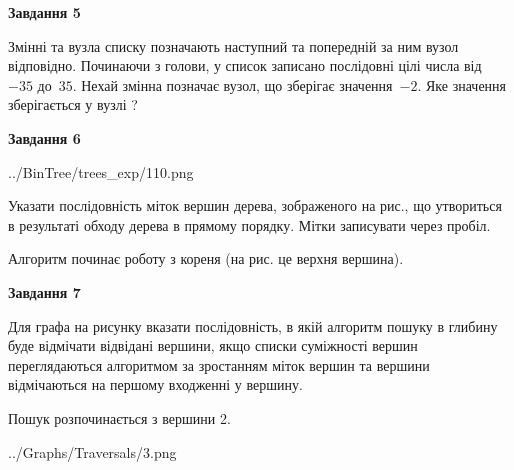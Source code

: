 \documentclass[12pt, ukrainian]{article}
\begin{document}
{\begin {large}
{\begin {center}\textbf{Завдання 5}\end {center}}\par
Змінні  та  вузла списку позначають наступний та попередній за ним вузол відповідно. Починаючи з голови, у список записано послідовні цілі числа від~$-35$ до~$35$. Нехай змінна  позначає вузол, що зберігає значення~$-2$.
Яке значення зберігається у вузлі  ?\par
\newpage

{\begin {center}\textbf{Завдання 6}\end {center}}\par

\begin{center}
	{../BinTree/trees_exp/110.png}
\end{center}
Указати послідовність міток вершин дерева, зображеного на рис., що утвориться в результаті обходу дерева в прямому порядку. Мітки записувати через пробіл.\par Алгоритм починає роботу з кореня (на рис. це верхня вершина).\par
\newpage

{\begin {center}\textbf{Завдання 7}\end {center}}\par
Для графа на рисунку вказати послідовність, в якій алгоритм пошуку в глибину буде відмічати відвідані вершини, якщо списки суміжності вершин переглядаються алгоритмом за зростанням міток вершин та вершини відмічаються на першому вход\-женні у вершину.\par
Пошук розпочинається з вершини 2.\par

\begin{center}
	{../Graphs/Traversals/3.png}
\end{center}\par
\newpage


\end{large}}
\end{document}
